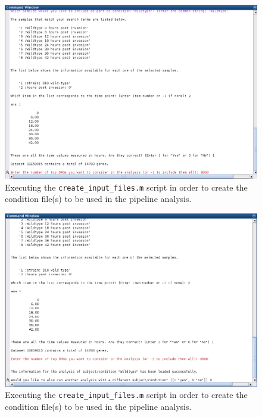 \documentclass[final,letterpaper,twoside,12pt]{article}
\begin{document}
\begin{figure}[h]
\includegraphics[width=\textwidth]{create_files_9}
\caption{Executing the \texttt{create\_input\_files.m} script in order to create the condition file(s) to be used in the pipeline analysis.}
\label{figure:create_files_9}
\end{figure}

\begin{figure}[h]
\includegraphics[width=\textwidth]{create_files_10}
\caption{Executing the \texttt{create\_input\_files.m} script in order to create the condition file(s) to be used in the pipeline analysis.}
\label{figure:create_files_10}
\end{figure}
\end{document}
